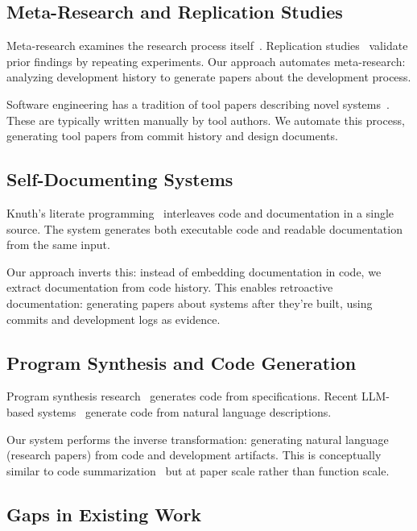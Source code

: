 \subsection{Meta-Research and Replication Studies}

Meta-research examines the research process itself~\cite{ioannidis2005most}. Replication studies~\cite{juristo2010replication} validate prior findings by repeating experiments. Our approach automates meta-research: analyzing development history to generate papers about the development process.

Software engineering has a tradition of tool papers describing novel systems~\cite{ernst2014tool}. These are typically written manually by tool authors. We automate this process, generating tool papers from commit history and design documents.

\subsection{Self-Documenting Systems}

Knuth's literate programming~\cite{knuth1984literate} interleaves code and documentation in a single source. The system generates both executable code and readable documentation from the same input.

Our approach inverts this: instead of embedding documentation in code, we extract documentation from code history. This enables retroactive documentation: generating papers about systems after they're built, using commits and development logs as evidence.

\subsection{Program Synthesis and Code Generation}

Program synthesis research~\cite{gulwani2017program} generates code from specifications. Recent LLM-based systems~\cite{chen2021codex,austin2021program} generate code from natural language descriptions.

Our system performs the inverse transformation: generating natural language (research papers) from code and development artifacts. This is conceptually similar to code summarization~\cite{haiduc2010supporting} but at paper scale rather than function scale.

\subsection{Gaps in Existing Work}

